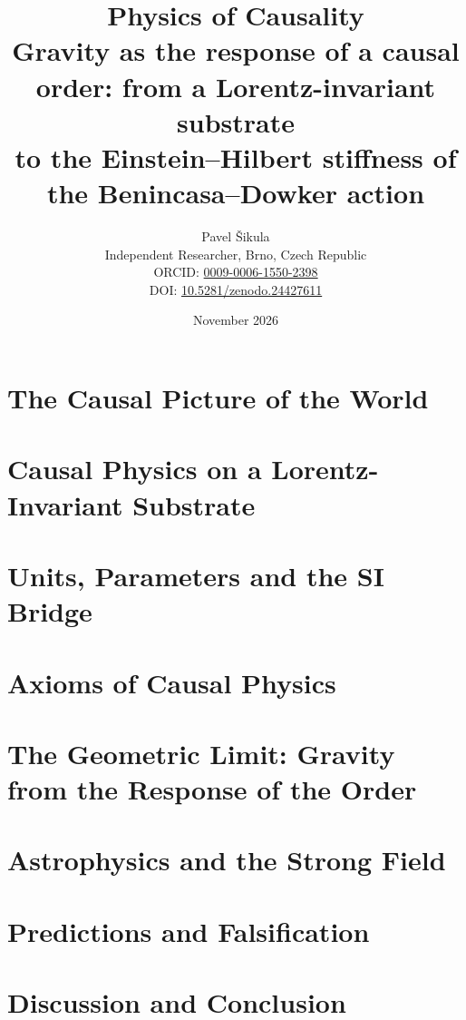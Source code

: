 \documentclass[11pt,a4paper]{article}
\title{Physics of Causality\\[4pt]
\large Gravity as the response of a causal order: from a Lorentz-invariant substrate\\
to the Einstein--Hilbert stiffness of the Benincasa--Dowker action}
\author{Pavel \v{S}ikula\\ \small Independent Researcher, Brno, Czech Republic\\ \small ORCID: \href{https://orcid.org/0009-0006-1550-2398}{0009-0006-1550-2398}\\ \small DOI: \href{https://doi.org/10.5281/zenodo.24427611}{10.5281/zenodo.24427611}}
\date{November 2026}
\begin{document}
\maketitle

\tableofcontents
\clearpage



\part{The Causal Picture of the World}\label{part:ontology}


\part{Causal Physics on a Lorentz-Invariant Substrate}\label{part:foundations}


\part{Units, Parameters and the SI Bridge}\label{part:units}


\part{Axioms of Causal Physics}\label{part:axioms}


\part{The Geometric Limit: Gravity from the Response of the Order}\label{part:geometric}


\part{Astrophysics and the Strong Field}\label{part:astro}


\part{Predictions and Falsification}\label{part:predictions}


\part{Discussion and Conclusion}\label{part:discussion}

\end{document}
